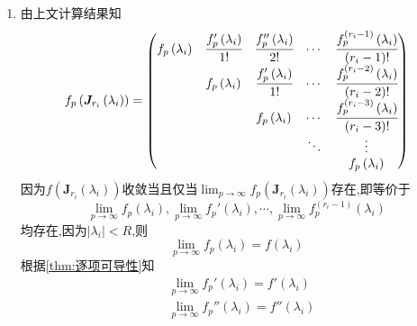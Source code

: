 \begin{formal}
\begin{Proof}
\begin{enumerate}[label={\textup{(\arabic*)}}]
\begin{align*}
                            \bm{X}_k
                        \right)
                    \right\}\\
                    &=\mathrm{diag}\,\left\{
                        f\left(
                            \bm{X}_1
                        \right),f\left(
                            \bm{X}_2
                        \right),\cdots,f\left(
                            \bm{X}_k
                        \right)
                    \right\}
                \end{align*}
                \item 由上文计算结果知\[
                f_p\left(
                    \bm{J}_{r_i}\left(\lambda_i\right)
                \right)=\begin{pmatrix}
        f_p\left(\lambda_i\right)&\cfrac{f_p'\left(\lambda_i\right)}{1!}&\cfrac{f_p''\left(\lambda_i\right)}{2!}&\cdots&\cfrac{f_p^{\left(r_i-1\right)}\left(\lambda_i\right)}{\left(r_i-1\right)!}\\
        &f_p\left(\lambda_i\right)&\cfrac{f_p'\left(\lambda_i\right)}{1!}&\cdots&\cfrac{f_p^{\left(r_i-2\right)}\left(\lambda_i\right)}{\left(r_i-2\right)!}\\
        &&f_p\left(\lambda_i\right)&\cdots&\cfrac{f_p^{\left(r_i-3\right)}\left(\lambda_i\right)}{\left(r_i-3\right)!}\\
        &&&\ddots&\vdots\\
        &&&&f_p\left(\lambda_i\right)
    \end{pmatrix}
                \]因为$f\left(\bm{J}_{r_i}\left(\lambda_i\right)\right)$收敛当且仅当$\displaystyle
                \lim_{p\to\infty}f_p\left(
                    \bm{J}_{r_i}\left(\lambda_i\right)
                    \right)$存在,即等价于\[
                    \lim_{p\to\infty}f_p\left(
                       \lambda_i
                        \right),\lim_{p\to\infty}f_p'\left(
                            \lambda_i
                        \right),\cdots,\lim_{p\to\infty}f_p^{\left(r_i-1\right)}\left(
                            \lambda_i
                        \right)
                    \]均存在,因为$\left|\lambda_i\right|<R$,则\[
                    \lim_{p\to\infty}f_p\left(\lambda_i\right)=f\left(\lambda_i\right)
                    \]根据\cref{thm:逐项可导性}知\begin{align*}
                        &\lim_{p\to\infty}f_p'\left(\lambda_i\right)=f'\left(\lambda_i\right)\\
                        &\lim_{p\to\infty}f_p''\left(\lambda_i\right)=f''\left(\lambda_i\right)\\

\end{align*}
\end{enumerate}
\end{Proof}
\end{formal}
